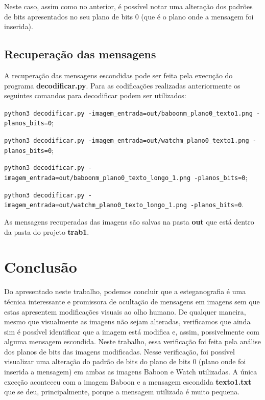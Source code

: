 \documentclass{article}
\begin{document}
Neste caso, assim como no anterior, é possível notar uma alteração dos padrões de bits apresentados no seu plano de bits 0 (que é o plano onde a mensagem foi inserida).

\subsection{Recuperação das mensagens}
A recuperação das mensagens escondidas pode ser feita pela execução do programa \textbf{decodificar.py}. Para as codificações realizadas anteriormente os seguintes comandos para decodificar podem ser utilizados:

\lstinline{python3 decodificar.py -imagem_entrada=out/baboonm_plano0_texto1.png -planos_bits=0};

\lstinline{python3 decodificar.py -imagem_entrada=out/watchm_plano0_texto1.png -planos_bits=0};

\lstinline{python3 decodificar.py -imagem_entrada=out/baboonm_plano0_texto_longo_1.png -planos_bits=0};

\lstinline{python3 decodificar.py -imagem_entrada=out/watchm_plano0_texto_longo_1.png -planos_bits=0}.

\noindent
As mensagens recuperadas das imagens são salvas na pasta \textbf{out} que está dentro da pasta do projeto \textbf{trab1}.

\section{Conclusão}
Do apresentado neste trabalho, podemos concluir que a esteganografia é uma técnica interessante e promissora de ocultação de mensagens em imagens sem que estas apresentem modificações visuais ao olho humano. De qualquer maneira, mesmo que visualmente as imagens não sejam alteradas, verificamos que ainda sim é possível identificar que a imagem está modifica e, assim, possivelmente com alguma mensagem escondida. Neste trabalho, essa verificação foi feita pela análise dos planos de bits das imagens modificadas. Nesse verificação, foi possível visualizar uma alteração do padrão de bits do plano de bits 0 (plano onde foi inserida a mensagem) em ambas as imagens Baboon e Watch utilizadas. A única exceção aconteceu com a imagem Baboon e a mensagem escondida \textbf{texto1.txt} que se deu, principalmente, porque a mensagem utilizada é muito pequena.
\end{document}
